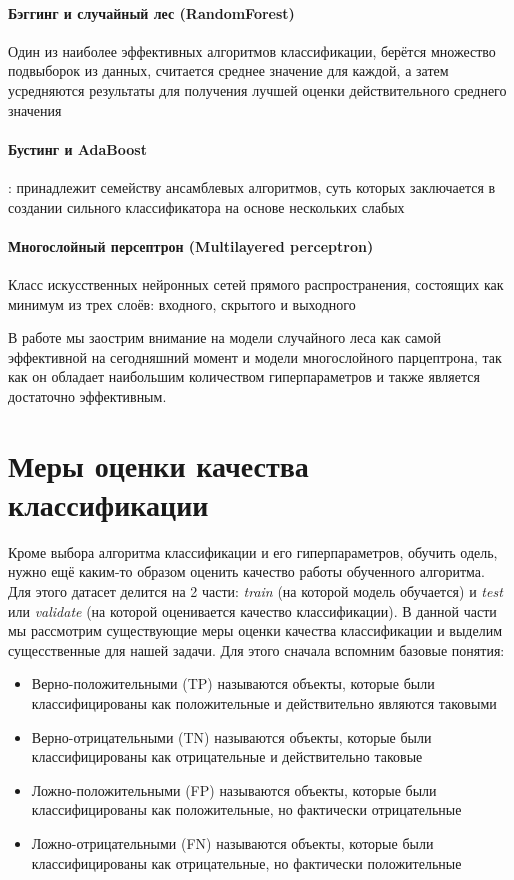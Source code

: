 \documentclass[times,specification,annotation]{itmo-student-thesis}
\begin{document}
	\paragraph{Бэггинг и случайный лес (RandomForest)} Один из наиболее эффективных алгоритмов классификации, берётся множество подвыборок из данных, считается среднее значение для каждой, а затем усредняются результаты для получения лучшей оценки действительного среднего значения
	\paragraph{Бустинг и AdaBoost}: принадлежит семейству ансамблевых алгоритмов, суть которых заключается в создании сильного классификатора на основе нескольких слабых
	\paragraph{Многослойный персептрон (Multilayered perceptron)} Класс искусственных нейронных сетей прямого распространения, состоящих как минимум из трех слоёв: входного, скрытого и выходного 

	В работе мы заострим внимание на модели случайного леса как самой эффективной на сегодняшний момент и модели многослойного парцептрона, так как он обладает наибольшим количеством гиперпараметров и также является достаточно эффективным.
	
	\section{Меры оценки качества классификации} \label{s:mcl}
	Кроме выбора алгоритма классификации и его гиперпараметров, обучить одель, нужно ещё каким-то образом оценить качество работы обученного алгоритма. Для этого датасет делится на 2 части: \textit{train} (на которой модель обучается) и \textit{test} или \textit{validate} (на которой оценивается качество классификации). В данной части мы рассмотрим существующие меры оценки качества классификации и выделим сущесственные для нашей задачи. Для этого сначала вспомним базовые понятия\cite{yu2019anyprecision}:
	\begin{itemize}
		\item Верно-положительными (TP) называются объекты, которые были классифицированы как положительные и действительно являются таковыми
		\item Верно-отрицательными (TN) называются объекты, которые были классифицированы как отрицательные и действительно таковые 
		\item Ложно-положительными (FP) называются объекты, которые были классифицированы как положительные, но фактически отрицательные
		\item Ложно-отрицательными (FN) называются объекты, которые были классифицированы как отрицательные, но фактически положительные
	\end{itemize}
\end{document}
